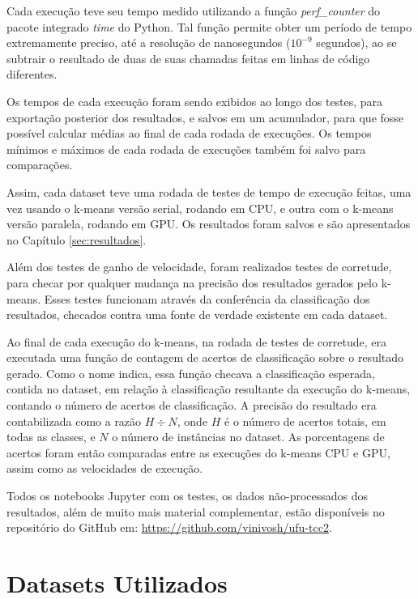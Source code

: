 \documentclass[12pt,
openright, 
oneside, %
a4paper,    %
brazil]{facom-ufu-abntex2}
\begin{document}
Cada execução teve seu tempo medido utilizando a função \textit{perf\_counter} do pacote integrado \textit{time} do Python. Tal função permite obter um período de tempo extremamente preciso, até a resolução de nanosegundos ($10^{-9}$ segundos), ao se subtrair o resultado de duas de suas chamadas feitas em linhas de código diferentes.

Os tempos de cada execução foram sendo exibidos ao longo dos testes, para exportação posterior dos resultados, e salvos em um acumulador, para que fosse possível calcular médias ao final de cada rodada de execuções. Os tempos mínimos e máximos de cada rodada de execuções também foi salvo para comparações.

Assim, cada dataset teve uma rodada de testes de tempo de execução feitas, uma vez usando o k-means versão serial, rodando em CPU, e outra com o k-means versão paralela, rodando em GPU. Os resultados foram salvos e são apresentados no Capítulo \ref{sec:resultados}.

Além dos testes de ganho de velocidade, foram realizados testes de corretude, para checar por qualquer mudança na precisão dos resultados gerados pelo k-means. Esses testes funcionam através da conferência da classificação dos resultados, checados contra uma fonte de verdade existente em cada dataset.

Ao final de cada execução do k-means, na rodada de testes de corretude, era executada uma função de contagem de acertos de classificação sobre o resultado gerado. Como o nome indica, essa função checava a classificação esperada, contida no dataset, em relação à classificação resultante da execução do k-means, contando o número de acertos de classificação. A precisão do resultado era contabilizada como a razão $H \div N$, onde $H$ é o número de acertos totais, em todas as classes, e $N$ o número de instâncias no dataset. As porcentagens de acertos foram então comparadas entre as execuções do k-means CPU e GPU, assim como as velocidades de execução.

Todos os notebooks Jupyter com os testes, os dados não-processados dos resultados, além de muito mais material complementar, estão disponíveis no repositório do GitHub em: \href{https://github.com/vinivosh/ufu-tcc2}{https://github.com/vinivosh/ufu-tcc2}.




\section{Datasets Utilizados}
\label{sec:datasetsUtilizados}
\end{document}
